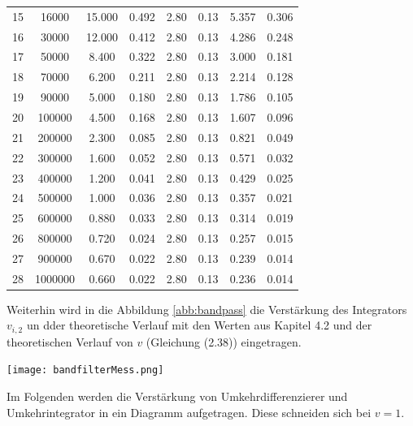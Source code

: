 \begin{center}
\begin{tabular}{l | c c c c c | c c}
        15 &    16000 &  15.000 &      0.492 &    2.80 &       0.13 &  5.357 &  0.306 \\
        16 &    30000 &  12.000 &      0.412 &    2.80 &       0.13 &  4.286 &  0.248 \\
        17 &    50000 &   8.400 &      0.322 &    2.80 &       0.13 &  3.000 &  0.181 \\
        18 &    70000 &   6.200 &      0.211 &    2.80 &       0.13 &  2.214 &  0.128 \\
        19 &    90000 &   5.000 &      0.180 &    2.80 &       0.13 &  1.786 &  0.105 \\
        20 &   100000 &   4.500 &      0.168 &    2.80 &       0.13 &  1.607 &  0.096 \\
        21 &   200000 &   2.300 &      0.085 &    2.80 &       0.13 &  0.821 &  0.049 \\
        22 &   300000 &   1.600 &      0.052 &    2.80 &       0.13 &  0.571 &  0.032 \\
        23 &   400000 &   1.200 &      0.041 &    2.80 &       0.13 &  0.429 &  0.025 \\
        24 &   500000 &   1.000 &      0.036 &    2.80 &       0.13 &  0.357 &  0.021 \\
        25 &   600000 &   0.880 &      0.033 &    2.80 &       0.13 &  0.314 &  0.019 \\
        26 &   800000 &   0.720 &      0.024 &    2.80 &       0.13 &  0.257 &  0.015 \\
        27 &   900000 &   0.670 &      0.022 &    2.80 &       0.13 &  0.239 &  0.014 \\
        28 &  1000000 &   0.660 &      0.022 &    2.80 &       0.13 &  0.236 &  0.014 \\
    \end{tabular}
    \label{tab:bandpass}
\end{center}
Weiterhin wird in die Abbildung \ref{abb:bandpass} die Verstärkung des Integrators $v_{i,2}$ un dder theoretische Verlauf mit den Werten aus Kapitel 4.2 und der theoretischen Verlauf von $v$ (Gleichung (2.38)) eingetragen.
\newpage
\begin{center}
    \texttt{[image: bandfilterMess.png]} 
    \label{abb:bandpass}
\end{center}
\newpage
Im Folgenden werden die Verstärkung von Umkehrdifferenzierer und Umkehrintegrator in ein Diagramm aufgetragen. Diese schneiden sich bei $v = 1$.\\
